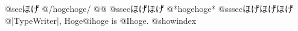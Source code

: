 ﻿\documentclass{jsarticle}
\begin{document}
@sec{ほげ}
@/hogehoge/ @@
@ssec{ほげほげ}
@*hogehoge*
@sssec{ほげほげほげ}
@|TypeWriter|, Hoge@i{hoge} is @I{hoge}.
@showindex
\end{document}
